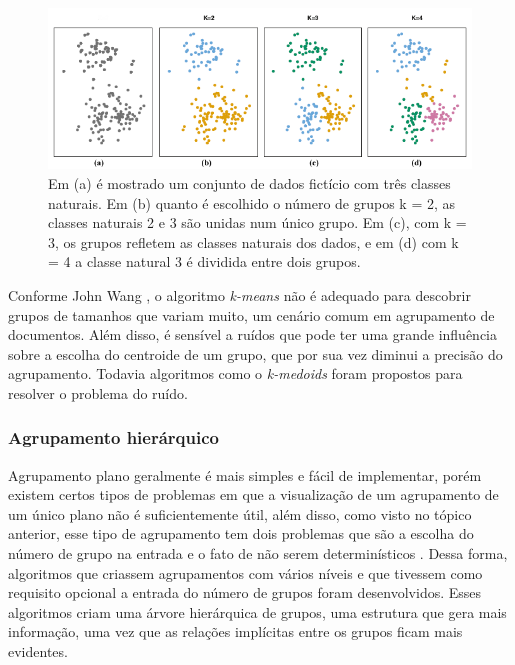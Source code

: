 \documentclass[a4paper,12pt]{article}
\begin{document}
\begin{figure}[H]
    \begin{center}
        \includegraphics[scale=0.8]{cluster_1.png}
    \end{center}
    \caption{Em (a) é mostrado um conjunto de dados fictício com três classes naturais. Em (b) quanto é escolhido o número de grupos k = 2, as classes naturais 2 e 3 são unidas num único grupo. Em (c), com k = 3, os grupos refletem as classes naturais dos dados, e em (d) com k = 4 a classe natural 3 é dividida entre dois grupos.}
    \label{fig:problema_kmeans}
\end{figure}

Conforme John Wang \cite{Wang09}, o algoritmo \textit{k-means} não é adequado para descobrir grupos de tamanhos que variam muito, um cenário comum em agrupamento de documentos. Além disso, é sensível a ruídos que pode ter uma grande influência sobre a escolha do centroide de um grupo, que por sua vez diminui a precisão do agrupamento. Todavia algoritmos como o \textit{k-medoids} \cite{Wang09} foram propostos para resolver o problema do ruído.

\subsubsection{Agrupamento hierárquico}
\label{sec:agrupamento_hierarquico}

Agrupamento plano geralmente é mais simples e fácil de implementar, porém existem certos tipos de problemas em que a visualização de um agrupamento de um único plano não é suficientemente útil, além disso, como visto no tópico anterior, esse tipo de agrupamento tem dois problemas que são a escolha do número de grupo na entrada e o fato de não serem determinísticos \cite{Manning09}. Dessa forma, algoritmos que criassem agrupamentos com vários níveis e que tivessem como requisito opcional a entrada do número de grupos foram desenvolvidos. Esses algoritmos criam uma árvore hierárquica de grupos, uma estrutura que gera mais informação, uma vez que as relações implícitas entre os grupos ficam mais evidentes.
\end{document}
